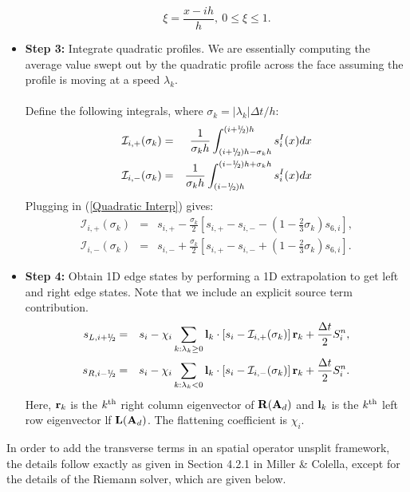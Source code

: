 \begin{itemize}
\begin{equation}
\xi = \frac{x - ih}{h}, ~ 0 \le \xi \le 1.
\end{equation}
\item {\bf Step 3:} Integrate quadratic profiles.  We are essentially
  computing the average value swept out by the quadratic profile
  across the face assuming the profile is moving at a speed
  $\lambda_k$.\\ \\ Define the following integrals, where $\sigma_k =
  |\lambda_k|\Delta t/h$:
\begin{eqnarray}
\mathcal{I}_{i,+}(\sigma_k) &=& \frac{1}{\sigma_k h}\int_{(i+\myhalf)h-\sigma_k h}^{(i+\myhalf)h}s_i^I(x)dx \\
\mathcal{I}_{i,-}(\sigma_k) &=& \frac{1}{\sigma_k h}\int_{(i-\myhalf)h}^{(i-\myhalf)h+\sigma_k h}s_i^I(x)dx
\end{eqnarray}
Plugging in (\ref{Quadratic Interp}) gives:
\begin{eqnarray}
\mathcal{I}_{i,+}(\sigma_k) &=& s_{i,+} - \frac{\sigma_k}{2}\left[s_{i,+}-s_{i,-}-\left(1-\frac{2}{3}\sigma_k\right)s_{6,i}\right], \\
\mathcal{I}_{i,-}(\sigma_k) &=& s_{i,-} + \frac{\sigma_k}{2}\left[s_{i,+}-s_{i,-}+\left(1-\frac{2}{3}\sigma_k\right)s_{6,i}\right].
\end{eqnarray}
\item {\bf Step 4:} Obtain 1D edge states by performing a 1D
  extrapolation to get left and right edge states.  Note that we
  include an explicit source term contribution.
\begin{eqnarray}
s_{L,i+\myhalf} &=& s_i - \chi_i\sum_{k:\lambda_k \ge 0}\lb_k\cdot\left[s_i-\mathcal{I}_{i,+}(\sigma_k)\right]\rb_k + \frac{\dt}{2}S_i^n, \\
s_{R,i-\myhalf} &=& s_i - \chi_i\sum_{k:\lambda_k < 0}\lb_k\cdot\left[s_i-\mathcal{I}_{i,-}(\sigma_k)\right]\rb_k + \frac{\dt}{2}S_i^n.
\end{eqnarray}
Here, ${\bf r}_k$ is the $k^{\rm th}$ right column eigenvector of
${\bf R}({\bf A}_d)$ and ${\bf l}_k$ is the $k^{\rm th}$ left row eigenvector lf
${\bf L}({\bf A}_d)$.  The flattening coefficient is $\chi_i$.
\end{itemize}
In order to add the transverse terms in an spatial operator unsplit
framework, the details follow exactly as given in Section 4.2.1 in
Miller \& Colella, except for the details of the Riemann solver,
which are given below.


